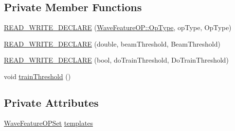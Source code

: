 \subsection*{Private Member Functions}
\begin{DoxyCompactItemize}
\item 
\hyperlink{class_word_dtw_recognition_aa97bdcc7b5ed94afc6597ec3ece754b6}{R\+E\+A\+D\+\_\+\+W\+R\+I\+T\+E\+\_\+\+D\+E\+C\+L\+A\+R\+E} (\hyperlink{class_wave_feature_o_p_a9c2fd724a37768ed03dc5b011d257500}{Wave\+Feature\+O\+P\+::\+Op\+Type}, op\+Type, Op\+Type)
\item 
\hyperlink{class_word_dtw_recognition_a62ec53317ee1451f33dd416f78c512c8}{R\+E\+A\+D\+\_\+\+W\+R\+I\+T\+E\+\_\+\+D\+E\+C\+L\+A\+R\+E} (double, beam\+Threshold, Beam\+Threshold)
\item 
\hyperlink{class_word_dtw_recognition_a71b41be3f78545c7444dd57f60bb3c6c}{R\+E\+A\+D\+\_\+\+W\+R\+I\+T\+E\+\_\+\+D\+E\+C\+L\+A\+R\+E} (bool, do\+Train\+Threshold, Do\+Train\+Threshold)
\item 
void \hyperlink{class_word_dtw_recognition_a912c5401af8c1bea59c680076c8e04a3}{train\+Threshold} ()
\end{DoxyCompactItemize}
\subsection*{Private Attributes}
\begin{DoxyCompactItemize}
\item 
\hyperlink{class_wave_feature_o_p_set}{Wave\+Feature\+O\+P\+Set} \hyperlink{class_word_dtw_recognition_a1c3086c9382b4bd282230044b15b3d01}{templates}
\end{DoxyCompactItemize}


